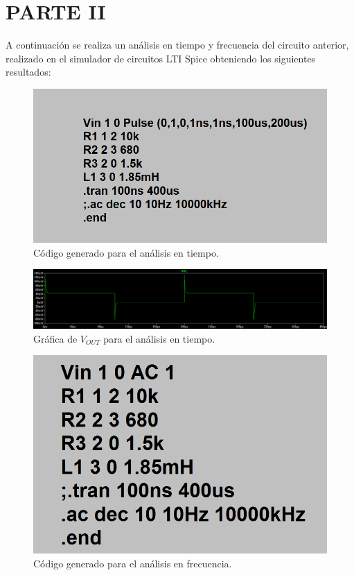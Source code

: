 \documentclass[letterpaper,12pt]{article}
\begin{document}
\section*{PARTE II}
A continuación se realiza un análisis en tiempo y frecuencia del circuito anterior, realizado en el simulador de circuitos LTI Spice obteniendo los siguientes resultados:
\begin{figure}[H]
	\centering
	\includegraphics[scale=0.7]{SimTiempo}
	\caption{Código generado para el análisis en tiempo.}
	\label{CTiempo}
\end{figure}
\begin{figure}[H]
	\centering
	\includegraphics[scale=0.6]{SimTiempoGrafica}
	\caption{Gráfica de $V_{OUT}$ para el análisis en tiempo.}
	\label{CTiempoG}
\end{figure}
\begin{figure}[H]
	\centering
	\includegraphics[scale=0.7]{SimFrecuencia}
	\caption{Código generado para el análisis en frecuencia.}
	\label{CFrecuencia}
\end{figure}
\end{document}
